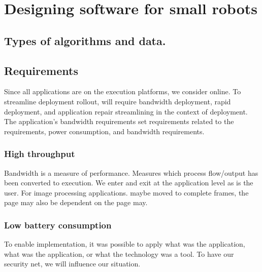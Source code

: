 \chapter{Designing software for small robots}


\FloatBarrier
\section{Types of algorithms and data.}


\FloatBarrier
\section{Requirements}
Since all applications are on the execution platforms, we consider online.
To streamline deployment rollout, will require bandwidth deployment, rapid deployment, 
and application repair streamlining in the context of deployment. 
The application's bandwidth requirements set requirements related to the requirements, 
power consumption, and bandwidth requirements. 

\FloatBarrier
\subsection{High throughput} 
Bandwidth is a measure of performance. Measures which process flow/output has been converted 
to execution. We enter and exit at the application level as is the user. 
For image processing applications. maybe moved to complete frames, the page may also be dependent 
on the page may. 

\FloatBarrier
\subsection{Low battery consumption}
To enable implementation, it was possible to apply what was the application, what was the 
application, or what the technology was a tool. To have our security net, we will influence 
our situation.
 
\FloatBarrier
